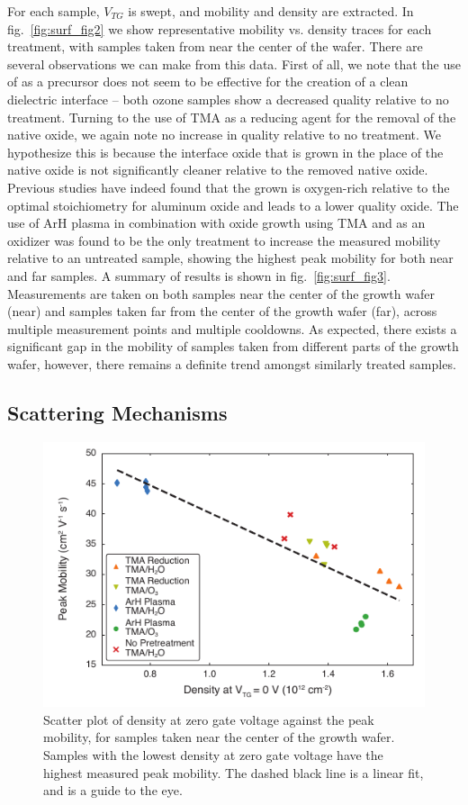 For each sample, $V_{TG}$ is swept, and mobility and density are extracted. In fig.~\ref{fig:surf_fig2} we show representative mobility vs. density traces for each treatment, with samples taken from near the center of the wafer. There are several observations we can make from this data. First of all, we note that the use of  as a precursor does not seem to be effective for the creation of a clean dielectric interface -- both ozone samples show a decreased quality relative to no treatment. Turning to the use of TMA as a reducing agent for the removal of the native oxide, we again note no increase in quality relative to no treatment. We hypothesize this is because the interface oxide that is grown in the place of the native oxide is not significantly cleaner relative to the removed native oxide. Previous studies have indeed found that the  grown is oxygen-rich relative to the optimal stoichiometry for aluminum oxide and leads to a lower quality oxide\cite{ingaas_redux,10.1021/cm0608903}. The use of ArH plasma in combination with oxide growth using TMA and  as an oxidizer was found to be the only treatment to increase the measured mobility relative to an untreated sample, showing the highest peak mobility for both near and far samples. A summary of results is shown in fig.~\ref{fig:surf_fig3}. Measurements are taken on both samples near the center of the growth wafer (near) and samples taken far from the center of the growth wafer (far), across multiple measurement points and multiple cooldowns. As expected, there exists a significant gap in the mobility of samples taken from different parts of the growth wafer, however, there remains a definite trend amongst similarly treated samples.

\subsection{\label{sec:surf_scat}Scattering Mechanisms}

\begin{figure}
    \includegraphics[width=0.6\linewidth]{Figure4}
    \caption[Peak mobilities against density at zero gate voltage]{\label{fig:surf_fig4}Scatter plot of density at zero gate voltage against the peak mobility, for samples taken near the center of the growth wafer. Samples with the lowest density at zero gate voltage have the highest measured peak mobility. The dashed black line is a linear fit, and is a guide to the eye.}
\end{figure}

